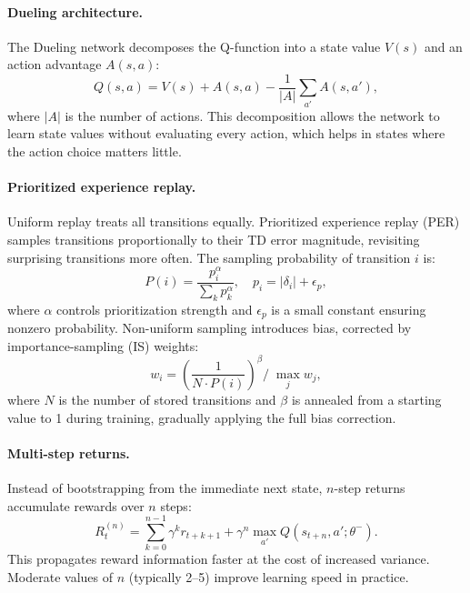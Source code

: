 \documentclass[12pt,a4paper,titlepage]{article}
\begin{document}
\paragraph{Dueling architecture.} The Dueling network \citep{Wang2016} decomposes the Q-function into a state value $V(s)$ and an action advantage $A(s, a)$:
\begin{equation}
Q(s, a) = V(s) + A(s, a) - \frac{1}{|A|}\sum_{a'} A(s, a'),
\end{equation}
where $|A|$ is the number of actions. This decomposition allows the network to learn state values without evaluating every action, which helps in states where the action choice matters little.

\paragraph{Prioritized experience replay.} Uniform replay treats all transitions equally. Prioritized experience replay (PER) \citep{Schaul2016} samples transitions proportionally to their TD error magnitude, revisiting surprising transitions more often. The sampling probability of transition $i$ is:
\begin{equation}
P(i) = \frac{p_i^\alpha}{\sum_k p_k^\alpha}, \quad p_i = |\delta_i| + \epsilon_p,
\end{equation}
where $\alpha$ controls prioritization strength and $\epsilon_p$ is a small constant ensuring nonzero probability. Non-uniform sampling introduces bias, corrected by importance-sampling (IS) weights:
\begin{equation}
w_i = \left(\frac{1}{N \cdot P(i)}\right)^\beta\!\bigg/\; \max_j w_j,
\end{equation}
where $N$ is the number of stored transitions and $\beta$ is annealed from a starting value to 1 during training, gradually applying the full bias correction.

\paragraph{Multi-step returns.} Instead of bootstrapping from the immediate next state, $n$-step returns \citep{Sutton1988} accumulate rewards over $n$ steps:
\begin{equation}
\label{eq:nstep}
R_t^{(n)} = \sum_{k=0}^{n-1} \gamma^k r_{t+k+1} + \gamma^n \max_{a'} Q(s_{t+n}, a'; \theta^-).
\end{equation}
This propagates reward information faster at the cost of increased variance. Moderate values of $n$ (typically 2--5) improve learning speed in practice.
\end{document}
